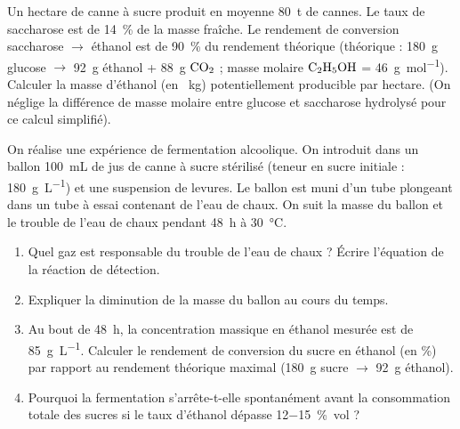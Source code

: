 \documentclass[11pt]{article}
\newcounter{popsec}
\newcounter{popsub}
\newcommand{\courssub}[1]{%
  \stepcounter{popsub}%
  \par\vspace{9pt}\noindent{\popxbold\fontsize{11.5}{13}\selectfont\color{popink}{\color{poporange}\thepopsec.\thepopsub}\hspace{6pt}#1}\par\nopagebreak\vspace{4pt}
}
\begin{document}
\begin{exercice}
Un hectare de canne à sucre produit en moyenne \SI{80}{\tonne} de cannes. Le taux de saccharose est de \SI{14}{\%} de la masse fraîche. Le rendement de conversion saccharose $\rightarrow$ éthanol est de \SI{90}{\%} du rendement théorique (théorique : \SI{180}{\gram} glucose $\rightarrow$ \SI{92}{\gram} éthanol + \SI{88}{\gram} $\ce{CO2}$ ; masse molaire $\ce{C2H5OH}$ = \SI{46}{\gram\per\mol}).
Calculer la masse d'éthanol (en \SI{}{\kg}) potentiellement producible par hectare. (On néglige la différence de masse molaire entre glucose et saccharose hydrolysé pour ce calcul simplifié).
\end{exercice}

\courssub{Je m'entraîne}

\begin{exercice}
On réalise une expérience de fermentation alcoolique. On introduit dans un ballon \SI{100}{\mL} de jus de canne à sucre stérilisé (teneur en sucre initiale : \SI{180}{\gram\per\liter}) et une suspension de levures. Le ballon est muni d'un tube plongeant dans un tube à essai contenant de l'eau de chaux. On suit la masse du ballon et le trouble de l'eau de chaux pendant \SI{48}{\hour} à \SI{30}{\celsius}.
\begin{enumerate}
\item Quel gaz est responsable du trouble de l'eau de chaux ? Écrire l'équation de la réaction de détection.
\item Expliquer la diminution de la masse du ballon au cours du temps.
\item Au bout de \SI{48}{\hour}, la concentration massique en éthanol mesurée est de \SI{85}{\gram\per\liter}. Calculer le rendement de conversion du sucre en éthanol (en \%) par rapport au rendement théorique maximal (\SI{180}{\gram} sucre $\rightarrow$ \SI{92}{\gram} éthanol).
\item Pourquoi la fermentation s'arrête-t-elle spontanément avant la consommation totale des sucres si le taux d'éthanol dépasse \SI{12-15}{\% vol} ?
\end{enumerate}
\end{exercice}
\end{document}
